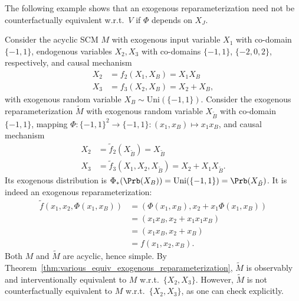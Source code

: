 The following example shows that an exogenous reparameterization need not be counterfactually equivalent w.r.t.\ $V$ if $\Phi$ depends on $X_J$.
\begin{Eg}\label{eg:exogenous_reparameterization_not_counterfactually_equivalent}
Consider the acyclic SCM $M$ with exogenous input variable $X_1$ with co-domain $\{-1,1\}$, endogenous variables $X_2,X_3$ with co-domains $\{-1,1\}$, $\{-2,0,2\}$, respectively, and causal mechanism
  $$\begin{aligned} 
    X_2 &= f_2(X_1,X_B) = X_1 X_B \\
    X_3 &= f_3(X_2,X_B) = X_2 + X_B,
  \end{aligned}$$
with exogenous random variable $X_B \sim \mathrm{Uni}(\{-1,1\})$.
Consider the exogenous reparameterization $\tilde{M}$ with exogenous random variable $X_{\tilde{B}}$ with co-domain $\{-1,1\}$, mapping $\Phi : \{-1,1\}^2 \to \{-1,1\} : (x_1,x_B) \mapsto x_1 x_B$, and causal mechanism
  $$\begin{aligned} 
    X_2 &= \tilde{f}_2(X_{\tilde{B}}) = X_{\tilde{B}} \\
    X_3 &= \tilde{f}_3(X_1, X_2, X_{\tilde{B}}) = X_2 + X_1 X_{\tilde{B}}.
  \end{aligned}$$ 
Its exogenous distribution is $\Phi_*(\Prb(X_B)) = \mathrm{Uni}(\{-1,1\}) = \Prb(X_{\tilde{B}})$.
It is indeed an exogenous reparameterization:
  $$\begin{aligned}
    \tilde{f}(x_1,x_2,\Phi(x_1,x_B)) 
    &= (\Phi(x_1,x_B), x_2 + x_1 \Phi(x_1,x_B)) \\
    &= (x_1 x_B, x_2 + x_1 x_1 x_B) \\
    &= (x_1 x_B, x_2 + x_B) \\
    &= f(x_1,x_2,x_B).
  \end{aligned}$$
Both $M$ and $\tilde{M}$ are acyclic, hence simple.
By Theorem~\ref{thm:various_equiv_exogenous_reparameterization}, $\tilde{M}$ is observably and interventionally equivalent to $M$ w.r.t.\ $\{X_2,X_3\}$.
However, $\tilde{M}$ is not counterfactually equivalent to $M$ w.r.t.\ $\{X_2,X_3\}$, as one can check explicitly.

\end{Eg}
